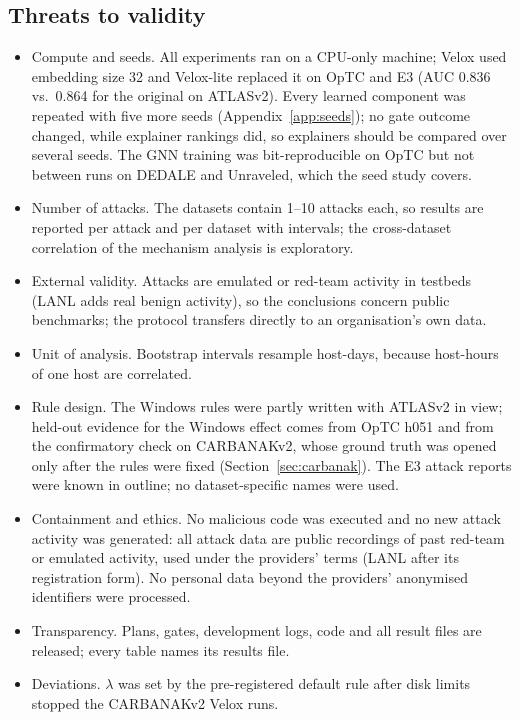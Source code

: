\documentclass[acmlarge,screen,review]{acmart}
\begin{document}
\subsection{Threats to validity}
\begin{itemize}
\item Compute and seeds. All experiments ran on a CPU-only machine; Velox used embedding size 32 and Velox-lite
replaced it on OpTC and E3 (AUC 0.836 vs.\ 0.864 for the original on ATLASv2). Every learned component was repeated
with five more seeds (Appendix~\ref{app:seeds}); no gate outcome changed, while explainer rankings did, so explainers
should be compared over several seeds. The GNN training was bit-reproducible on OpTC but not between runs on DEDALE
and Unraveled, which the seed study covers.
\item Number of attacks. The datasets contain 1--10 attacks each, so results are reported per attack and per
dataset with intervals; the cross-dataset correlation of the mechanism analysis is exploratory.
\item External validity. Attacks are emulated or red-team activity in testbeds (LANL adds real benign activity), so
the conclusions concern public benchmarks; the protocol transfers directly to an organisation's own data.
\item Unit of analysis. Bootstrap intervals resample host-days, because host-hours of one host are correlated.
\item Rule design. The Windows rules were partly written with ATLASv2 in view; held-out evidence for the Windows
effect comes from OpTC h051 and from the confirmatory check on CARBANAKv2, whose ground truth was opened only
after the rules were fixed (Section~\ref{sec:carbanak}). The E3 attack reports were known in outline; no
dataset-specific names were used.
\item Containment and ethics. No malicious code was executed and no new attack activity was generated: all
attack data are public recordings of past red-team or emulated activity, used under the providers' terms (LANL after
its registration form). No personal data beyond the providers' anonymised identifiers were processed.
\item Transparency. Plans, gates, development logs, code and all result files are released; every table names its
results file.
\item Deviations. $\lambda$ was set by the pre-registered default rule after disk limits stopped the CARBANAKv2
Velox runs.
\end{itemize}
\end{document}
